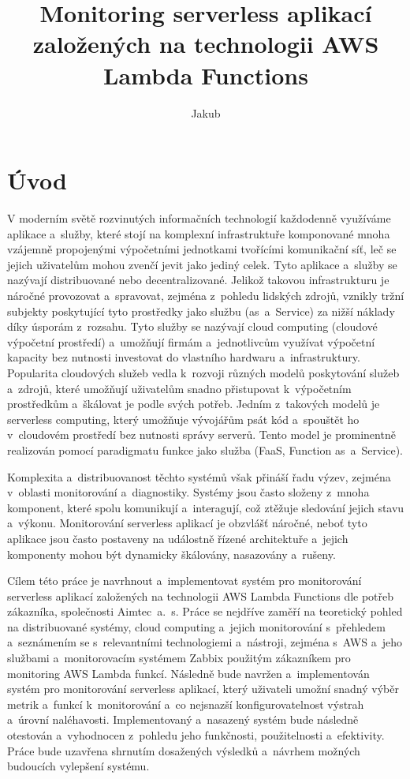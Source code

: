 \documentclass[czech, ing, kiv, he, iso690]{fasthesis}
\title{Monitoring serverless aplikací založených na technologii AWS Lambda Functions}
\author{Jakub}{Mladý}{Bc.}{}
\begin{document}
\frontpages[tm] %
\tableofcontents

\chapter{Úvod}
V moderním světě rozvinutých informačních technologií každodenně využíváme aplikace a~služby, které stojí na komplexní infrastruktuře komponované mnoha vzájemně propojenými výpočetními jednotkami tvořícími komunikační síť, leč se jejich uživatelům mohou zvenčí jevit jako jediný celek. Tyto aplikace a~služby se nazývají distribuované nebo decentralizované. Jelikož takovou infrastrukturu je náročné provozovat a~spravovat, zejména z~pohledu lidských zdrojů, vznikly tržní subjekty poskytující tyto prostředky jako službu (as~a~Service) za nižší náklady díky úsporám z~rozsahu. Tyto služby se nazývají cloud computing (cloudové výpočetní prostředí) a~umožňují firmám a~jednotlivcům využívat výpočetní kapacity bez nutnosti investovat do vlastního hardwaru a~infrastruktury. Popularita cloudových služeb vedla k~rozvoji různých modelů poskytování služeb a~zdrojů, které umožňují uživatelům snadno přistupovat k~výpočetním prostředkům a~škálovat je podle svých potřeb. Jedním z~takových modelů je serverless computing, který umožňuje vývojářům psát kód a~spouštět ho v~cloudovém prostředí bez nutnosti správy serverů. Tento model je prominentně realizován pomocí paradigmatu funkce jako služba (FaaS, Function as~a~Service).

Komplexita a~distribuovanost těchto systémů však přináší řadu výzev, zejména v~oblasti monitorování a~diagnostiky. Systémy jsou často složeny z~mnoha komponent, které spolu komunikují a~interagují, což ztěžuje sledování jejich stavu a~výkonu. Monitorování serverless aplikací je obzvlášť náročné, neboť tyto aplikace jsou často postaveny na událostně řízené architektuře a~jejich komponenty mohou být dynamicky škálovány, nasazovány a~rušeny.

Cílem této práce je navrhnout a~implementovat systém pro monitorování serverless aplikací založených na technologii AWS Lambda Functions dle potřeb zákazníka, společnosti Aimtec~a.~s. Práce se nejdříve zaměří na teoretický pohled na distribuované systémy, cloud computing a~jejich monitorování s~přehledem a~seznámením se s~relevantními technologiemi a~nástroji, zejména s~AWS a~jeho službami a~monitorovacím systémem Zabbix použitým zákazníkem pro monitoring AWS Lambda funkcí. Následně bude navržen a~implementován systém pro monitorování serverless aplikací, který uživateli umožní snadný výběr metrik a~funkcí k~monitorování a~co nejsnazší konfigurovatelnost výstrah a~úrovní naléhavosti. Implementovaný a~nasazený systém bude následně otestován a~vyhodnocen z~pohledu jeho funkčnosti, použitelnosti a~efektivity. Práce bude uzavřena shrnutím dosažených výsledků a~návrhem možných budoucích vylepšení systému.
\end{document}

